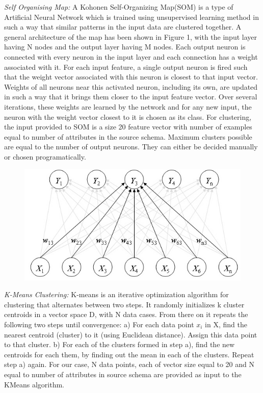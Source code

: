 \documentclass[conference]{IEEEtran}
\begin{document}
\textit{Self Organising Map: }A Kohonen Self-Organizing Map(SOM) is a type of Artificial Neural Network which is trained using unsupervised learning method in such a way that similar patterns in the input data are clustered together. A general architecture of the map has been shown in Figure 1, with the input layer having N nodes and the output layer having M nodes. Each output neuron is connected with every neuron in the input layer and each connection has a weight associated with it. For each input feature, a single output neuron is fired such that the weight vector associated with this neuron is closest to that input vector. Weights of all neurons near this activated neuron, including its own, are updated in such a way that it brings them closer to the input feature vector. Over several iterations, these weights are learned by the network and for any new input, the neuron with the weight vector closest to it is chosen as its class. For clustering, the input provided to SOM is a size 20 feature vector with number of examples equal to number of attributes in the source schema. Maximum clusters possible are equal to the number of output neurons. They can either be decided manually or chosen programatically. 

\begin{figure}[h]
\centering
\includegraphics[scale=0.4]{1.jpeg}
\end{figure}


\textit{K-Means Clustering: }K-means is an iterative optimization algorithm for clustering that alternates between two steps. It randomly initializes k cluster centroids in a vector space D, with N data cases. From there on it repeats the following two steps until convergence: a) For each data point $x_i$ in X, find the nearest
centroid (cluster) to it (using Euclidean distance). Assign this data point to that cluster. b) For each of the clusters formed in step a), find the new centroids for each them, by finding out the mean in each of the clusters. Repeat step a) again. For our case, N data points, each of vector size equal to 20 and N equal to number of attributes in source schema are provided as input to the KMeans algorithm. 
\end{document}
